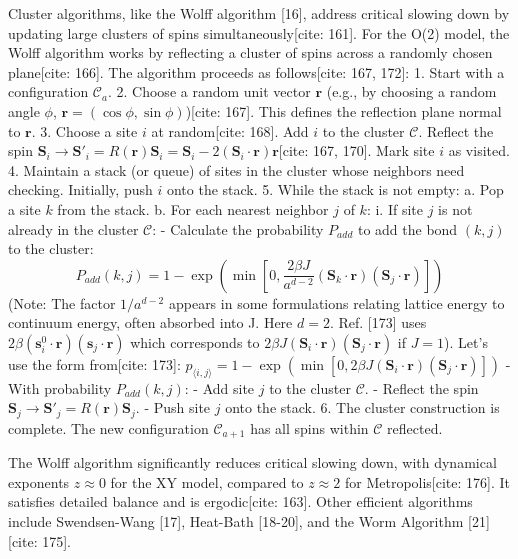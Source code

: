 \documentclass[11pt]{article}
\begin{document}
Cluster algorithms, like the Wolff algorithm [16], address critical slowing down by updating large clusters of spins simultaneously[cite: 161]. For the O(2) model, the Wolff algorithm works by reflecting a cluster of spins across a randomly chosen plane[cite: 166].
The algorithm proceeds as follows[cite: 167, 172]:
1.  Start with a configuration $\mathcal{C}_a$.
2.  Choose a random unit vector $\mathbf{r}$ (e.g., by choosing a random angle $\phi$, $\mathbf{r}=(\cos \phi, \sin \phi)$)[cite: 167]. This defines the reflection plane normal to $\mathbf{r}$.
3.  Choose a site $i$ at random[cite: 168]. Add $i$ to the cluster $\mathcal{C}$. Reflect the spin $\mathbf{S}_i \to \mathbf{S}'_i = R(\mathbf{r})\mathbf{S}_i = \mathbf{S}_i - 2 (\mathbf{S}_i \cdot \mathbf{r}) \mathbf{r}$[cite: 167, 170]. Mark site $i$ as visited.
4.  Maintain a stack (or queue) of sites in the cluster whose neighbors need checking. Initially, push $i$ onto the stack.
5.  While the stack is not empty:
    a. Pop a site $k$ from the stack.
    b. For each nearest neighbor $j$ of $k$:
        i. If site $j$ is not already in the cluster $\mathcal{C}$:
            - Calculate the probability $P_{add}$ to add the bond $(k, j)$ to the cluster:
              \begin{equation}
              P_{add}(k, j) = 1 - \exp\left( \min\left[0, \frac{2 \beta J}{a^{d-2}} (\mathbf{S}_k \cdot \mathbf{r}) (\mathbf{S}_j \cdot \mathbf{r}) \right] \right) \label{eq:wolff_prob}
              \end{equation}
              (Note: The factor $1/a^{d-2}$ appears in some formulations relating lattice energy to continuum energy, often absorbed into J. Here $d=2$. Ref. [173] uses $2\beta (\mathbf{s}_i^0 \cdot \mathbf{r})(\mathbf{s}_j \cdot \mathbf{r})$ which corresponds to $2 \beta J (\mathbf{S}_i \cdot \mathbf{r}) (\mathbf{S}_j \cdot \mathbf{r})$ if $J=1$). Let's use the form from[cite: 173]: $p_{\langle i,j \rangle} = 1 - \exp(\min[0, 2 \beta J (\mathbf{S}_i \cdot \mathbf{r})(\mathbf{S}_j \cdot \mathbf{r})])$
            - With probability $P_{add}(k, j)$:
                - Add site $j$ to the cluster $\mathcal{C}$.
                - Reflect the spin $\mathbf{S}_j \to \mathbf{S}'_j = R(\mathbf{r})\mathbf{S}_j$.
                - Push site $j$ onto the stack.
6.  The cluster construction is complete. The new configuration $\mathcal{C}_{a+1}$ has all spins within $\mathcal{C}$ reflected.

The Wolff algorithm significantly reduces critical slowing down, with dynamical exponents $z \approx 0$ for the XY model, compared to $z \approx 2$ for Metropolis[cite: 176]. It satisfies detailed balance and is ergodic[cite: 163]. Other efficient algorithms include Swendsen-Wang [17], Heat-Bath [18-20], and the Worm Algorithm [21][cite: 175].
\end{document}

